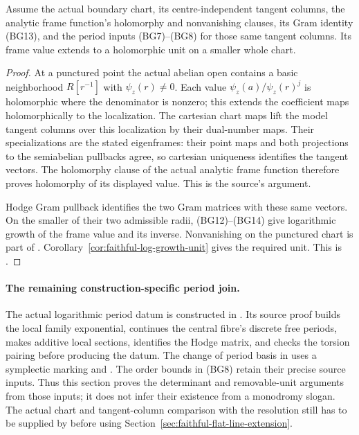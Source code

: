 \begin{srproposition}
\label{prop:faithful-bdry-chart-unit-extension}
Assume the actual boundary chart, its centre-independent tangent
columns, the analytic frame function's holomorphy and nonvanishing
clauses, its Gram identity (BG13), and the period inputs
(BG7)--(BG8) for those same tangent columns.
Its frame value extends to a holomorphic unit on a smaller whole chart.
\end{srproposition}
\begin{proof}
At a punctured point the actual abelian open contains a basic
neighborhood \(R[r^{-1}]\) with \(\psi_z(r)\ne0\).
Each value \(\psi_z(a)/\psi_z(r)^j\) is holomorphic where the
denominator is nonzero; this extends the coefficient maps
holomorphically to the localization.
The cartesian chart maps lift the model tangent columns over
this localization by their dual-number maps.
Their specializations are the stated eigenframes: their point maps
and both projections to the semiabelian pullbacks agree, so
cartesian uniqueness identifies the tangent vectors.
The holomorphy clause of the actual analytic frame function
therefore proves holomorphy of its displayed value.
This is the source's  argument.

Hodge Gram pullback identifies the two Gram matrices with these
same vectors. On the smaller of their two admissible radii,
(BG12)--(BG14) give logarithmic growth of the frame value and
its inverse. Nonvanishing on the punctured chart is part of
.
Corollary~\ref{cor:faithful-log-growth-unit} gives the required unit.
This is .
\end{proof}

\paragraph{The remaining construction-specific period join.}
The actual logarithmic period datum is constructed in
.
Its source proof builds the local family exponential, continues
the central fibre's discrete free periods, makes additive local
sections, identifies the Hodge matrix, and checks the torsion
pairing before producing the datum.
The change of period basis in
 uses a symplectic marking
and .
The order bounds in (BG8) retain their precise source inputs.
Thus this section proves the determinant and removable-unit
arguments from those inputs; it does not infer their existence
from a monodromy slogan.
The actual chart and tangent-column comparison with the
resolution still has to be supplied by
 before using
Section~\ref{sec:faithful-flat-line-extension}.

